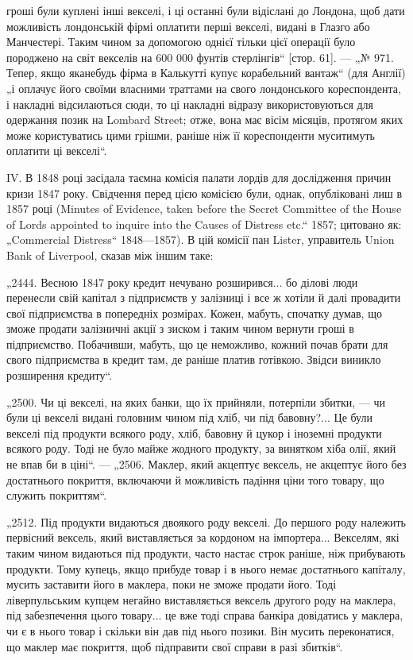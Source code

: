гроші були куплені інші векселі, і ці останні були відіслані до Лондона,
щоб дати можливість лондонській фірмі оплатити перші векселі, видані в Глазго
або Манчестері. Таким чином за допомогою однієї тільки цієї операції було породжено
на світ векселів на 600 000 фунтів стерлінгів“ [стор. 61]. — „№ 971.
Тепер, якщо яканебудь фірма в Калькутті купує корабельний вантаж“ (для Англії)
„і оплачує його своїми власними траттами на свого лондонського кореспондента,
і накладні відсилаються сюди, то ці накладні відразу використовуються для одержання позик на Lombard
Street; отже, вона має вісім місяців, протягом яких
може користуватись цими грішми, раніше ніж її кореспонденти муситимуть
оплатити ці векселі“.

IV. В 1848 році засідала таємна комісія палати лордів для дослідження причин
кризи 1847 року. Свідчення перед цією комісією були, однак, опубліковані
лиш в 1857 році (Minutes of Evidence, taken before the Secret Committee of the
House of Lords appointed to inquire into the Causes of Distress etc.“ 1857; цитовано як: „Commercial
Distress“ 1848—1857). В цій комісії пан Lister, управитель
Union Bank of Liverpool, сказав між іншим таке:

„2444. Весною 1847 року кредит нечувано розширився... бо ділові люди
перенесли свій капітал з підприємств у залізниці і все ж хотіли й далі провадити свої підприємства в
попередніх розмірах. Кожен, мабуть, спочатку думав,
що зможе продати залізничні акції з зиском і таким чином вернути гроші в підприємство. Побачивши,
мабуть, що це неможливо, кожний почав брати для свого
підприємства в кредит там, де раніше платив готівкою. Звідси виникло розширення кредиту“.

„2500. Чи ці векселі, на яких банки, що їх прийняли, потерпіли збитки, — чи
були ці векселі видані головним чином під хліб, чи під бавовну?... Це були
векселі під продукти всякого роду, хліб, бавовну й цукор і іноземні продукти всякого роду. Тоді не
було майже жодного продукту, за винятком хіба
олії, який не впав би в ціні“. — „2506. Маклер, який акцептує вексель, не акцептує його без
достатнього покриття, включаючи й можливість падіння ціни того
товару, що служить покриттям“.

„2512. Під продукти видаються двоякого роду векселі. До першого роду належить первісний вексель,
який виставляється за кордоном на імпортера... Векселям,
які таким чином видаються під продукти, часто настає строк раніше, ніж прибувають продукти. Тому
купець, якщо прибуде товар і в нього немає достатнього
капіталу, мусить заставити його в маклера, поки не зможе продати його. Тоді
ліверпульським купцем негайно виставляється вексель другого роду на маклера,
під забезпечення цього товару... це вже тоді справа банкіра довідатись у маклера, чи є в нього товар
і скільки він дав під нього позики. Він мусить переконатися, що маклер має покриття, щоб підправити
свої справи в разі збитків“.

